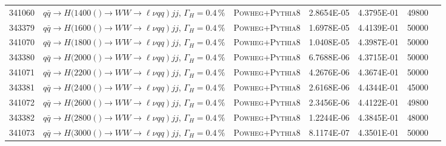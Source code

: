 \begin{landscape}
\begin{table}[!htb]
\begin{footnotesize}
\begin{center}
\begin{tabular}{|c|l|c|c|c|c|r|}
					341060 & $q\bar{q} \to H(1400\left() \to WW \to \ell\nu qq \right) jj$, $\Gamma_H=0.4\,\%$ & \textsc{Powheg}+\textsc{Pythia8} & 2.8654E-05 & 4.3795E-01 & 49800 \\
					343379 & $q\bar{q} \to H(1600\left() \to WW \to \ell\nu qq \right) jj$, $\Gamma_H=0.4\,\%$ & \textsc{Powheg}+\textsc{Pythia8} & 1.6978E-05 & 4.4139E-01 & 50000 \\
					341070 & $q\bar{q} \to H(1800\left() \to WW \to \ell\nu qq \right) jj$, $\Gamma_H=0.4\,\%$ & \textsc{Powheg}+\textsc{Pythia8} & 1.0408E-05 & 4.3987E-01 & 50000 \\
					343380 & $q\bar{q} \to H(2000\left() \to WW \to \ell\nu qq \right) jj$, $\Gamma_H=0.4\,\%$ & \textsc{Powheg}+\textsc{Pythia8} & 6.7688E-06 & 4.3715E-01 & 50000 \\
					341071 & $q\bar{q} \to H(2200\left() \to WW \to \ell\nu qq \right) jj$, $\Gamma_H=0.4\,\%$ & \textsc{Powheg}+\textsc{Pythia8} & 4.2676E-06 & 4.3674E-01 & 50000 \\
					343381 & $q\bar{q} \to H(2400\left() \to WW \to \ell\nu qq \right) jj$, $\Gamma_H=0.4\,\%$ & \textsc{Powheg}+\textsc{Pythia8} & 2.6168E-06 & 4.4344E-01 & 45000 \\
					341072 & $q\bar{q} \to H(2600\left() \to WW \to \ell\nu qq \right) jj$, $\Gamma_H=0.4\,\%$ & \textsc{Powheg}+\textsc{Pythia8} & 2.3456E-06 & 4.4122E-01 & 49800 \\
					343382 & $q\bar{q} \to H(2800\left() \to WW \to \ell\nu qq \right) jj$, $\Gamma_H=0.4\,\%$ & \textsc{Powheg}+\textsc{Pythia8} & 1.2244E-06 & 4.3845E-01 & 48000 \\
					341073 & $q\bar{q} \to H(3000\left() \to WW \to \ell\nu qq \right) jj$, $\Gamma_H=0.4\,\%$ & \textsc{Powheg}+\textsc{Pythia8} & 8.1174E-07 & 4.3501E-01 & 50000 \\
					\hline
				\end{tabular}
			\end{center}
		\end{footnotesize}
	\end{table}
\end{landscape}
